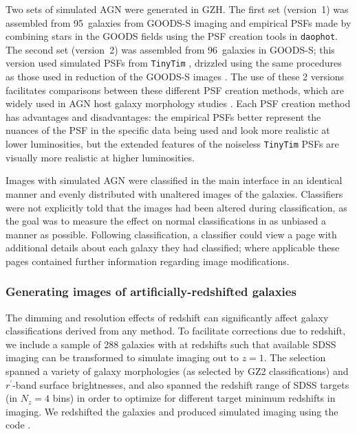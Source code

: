 \documentclass[twocolumn]{aastex6}
\begin{document}
Two sets of simulated AGN were generated in GZH. The first set (version~1) was
assembled from 95~galaxies from GOODS-S imaging and empirical PSFs made by
combining stars in the GOODS fields using the PSF creation tools in
\texttt{daophot}.  The second set (version~2) was assembled from 96~galaxies in
GOODS-S; this version used simulated PSFs from \texttt{TinyTim} \citep{kri93},
drizzled using the same procedures as those used in reduction of the GOODS-S
images \citep{koe02,koe03,gia04}. The use of these 2 versions facilitates
comparisons between these different PSF creation methods, which are widely used
in AGN host galaxy morphology studies
\citep[e.g.,][]{san04,sim08,pie10a,simm11}.  Each PSF creation method has
advantages and disadvantages: the empirical PSFs better represent the nuances
of the PSF in the specific data being used and look more realistic at lower
luminosities, but the extended features of the noiseless \texttt{TinyTim} PSFs
are visually more realistic at higher luminosities.

Images with simulated AGN were classified in the main interface in an identical
manner and evenly distributed with unaltered images of the galaxies.
Classifiers were not explicitly told that the images had been altered during
classification, as the goal was to measure the effect on normal classifications
in as unbiased a manner as possible. Following classification, a classifier
could view a page with additional details about each galaxy they had
classified; where applicable these pages contained further information
regarding image modifications.


\subsubsection{Generating images of artificially-redshifted galaxies}\label{ssec:ferengi}

The dimming and resolution effects of redshift can significantly affect galaxy
classifications derived from any method. To facilitate corrections due to
redshift, we include a sample of 288 galaxies with at redshifts such that
available SDSS imaging can be transformed to simulate \hst{} imaging out to $z
= 1$. The selection spanned a variety of galaxy morphologies (as selected by
GZ2 classifications) and $r^\prime$-band surface brightnesses, and also spanned
the redshift range of SDSS targets (in $N_z = 4$ bins) in order to optimize for
different target minimum redshifts in \hst{} imaging. We redshifted the
galaxies and produced simulated \hst{} imaging using the \ferengi{} code
\citep{bar08a}.
\end{document}
